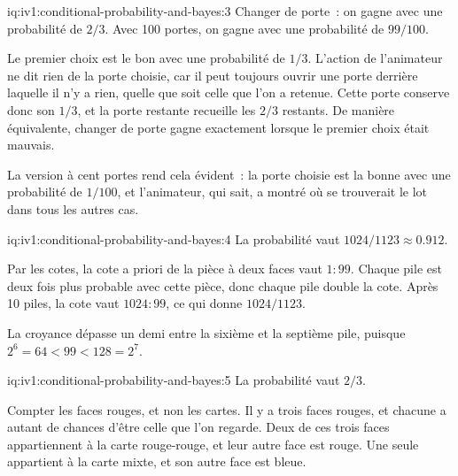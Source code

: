 \begin{solution}{iq:iv1:conditional-probability-and-bayes:3}
Changer de porte~: on gagne avec une probabilité de $2/3$. Avec 100 portes, on gagne avec une probabilité de $99/100$.

Le premier choix est le bon avec une probabilité de $1/3$. L'action de l'animateur ne dit rien de la porte choisie, car il peut toujours ouvrir une porte derrière laquelle il n'y a rien, quelle que soit celle que l'on a retenue. Cette porte conserve donc son $1/3$, et la porte restante recueille les $2/3$ restants. De manière équivalente, changer de porte gagne exactement lorsque le premier choix était mauvais.

La version à cent portes rend cela évident~: la porte choisie est la bonne avec une probabilité de $1/100$, et l'animateur, qui sait, a montré où se trouverait le lot dans tous les autres cas.

\end{solution}

\begin{solution}{iq:iv1:conditional-probability-and-bayes:4}
La probabilité vaut $1024/1123 \approx 0.912$.

Par les cotes, la cote a priori de la pièce à deux faces vaut $1 : 99$. Chaque pile est deux fois plus probable avec cette pièce, donc chaque pile double la cote. Après 10 piles, la cote vaut $1024 : 99$, ce qui donne $1024/1123$.

La croyance dépasse un demi entre la sixième et la septième pile, puisque $2^6 = 64 < 99 < 128 = 2^7$.

\end{solution}

\begin{solution}{iq:iv1:conditional-probability-and-bayes:5}
La probabilité vaut $2/3$.

Compter les faces rouges, et non les cartes. Il y a trois faces rouges, et chacune a autant de chances d'être celle que l'on regarde. Deux de ces trois faces appartiennent à la carte rouge-rouge, et leur autre face est rouge. Une seule appartient à la carte mixte, et son autre face est bleue.


\end{solution}

